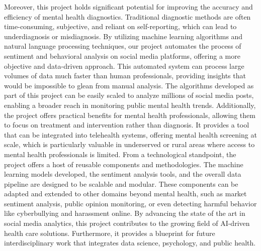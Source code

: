 \vspace{1em}
\noindent
Moreover, this project holds significant potential for improving the accuracy and efficiency of mental health diagnostics. Traditional diagnostic methods are often time-consuming, subjective, and reliant on self-reporting, which can lead to underdiagnosis or misdiagnosis. By utilizing machine learning algorithms and natural language processing techniques, our project automates the process of sentiment and behavioral analysis on social media platforms, offering a more objective and data-driven approach. This automated system can process large volumes of data much faster than human professionals, providing insights that would be impossible to glean from manual analysis. The algorithms developed as part of this project can be easily scaled to analyze millions of social media posts, enabling a broader reach in monitoring public mental health trends. Additionally, the project offers practical benefits for mental health professionals, allowing them to focus on treatment and intervention rather than diagnosis. It provides a tool that can be integrated into telehealth systems, offering mental health screening at scale, which is particularly valuable in underserved or rural areas where access to mental health professionals is limited. From a technological standpoint, the project offers a host of reusable components and methodologies. The machine learning models developed, the sentiment analysis tools, and the overall data pipeline are designed to be scalable and modular. These components can be adapted and extended to other domains beyond mental health, such as market sentiment analysis, public opinion monitoring, or even detecting harmful behavior like cyberbullying and harassment online. By advancing the state of the art in social media analytics, this project contributes to the growing field of AI-driven health care solutions. Furthermore, it provides a blueprint for future interdisciplinary work that integrates data science, psychology, and public health. 

